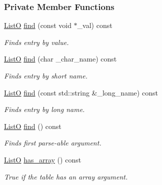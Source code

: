 \subsubsection*{Private Member Functions}
\begin{DoxyCompactItemize}
\item 
\hyperlink{classpoptmx_1_1OptionTable_abaa488ce786d8d553d851d225a82d804}{ListO} \hyperlink{classpoptmx_1_1OptionTable_a99e8f90a0239a5799f585c0830684b36}{find} (const void $\ast$\_\-val) const 
\begin{DoxyCompactList}\small\item\em Finds entry by value. \item\end{DoxyCompactList}\item 
\hyperlink{classpoptmx_1_1OptionTable_abaa488ce786d8d553d851d225a82d804}{ListO} \hyperlink{classpoptmx_1_1OptionTable_acb5976efec27ae5d63f7bbc3e767f758}{find} (char \_\-char\_\-name) const 
\begin{DoxyCompactList}\small\item\em Finds entry by short name. \item\end{DoxyCompactList}\item 
\hyperlink{classpoptmx_1_1OptionTable_abaa488ce786d8d553d851d225a82d804}{ListO} \hyperlink{classpoptmx_1_1OptionTable_a8ff4c5acc11225856c2b114096282f26}{find} (const std::string \&\_\-long\_\-name) const 
\begin{DoxyCompactList}\small\item\em Finds entry by long name. \item\end{DoxyCompactList}\item 
\hyperlink{classpoptmx_1_1OptionTable_abaa488ce786d8d553d851d225a82d804}{ListO} \hyperlink{classpoptmx_1_1OptionTable_af1e5020645bf627e5937e110143760d5}{find} () const 
\begin{DoxyCompactList}\small\item\em Finds first parse-\/able argument. \item\end{DoxyCompactList}\item 
\hyperlink{classpoptmx_1_1OptionTable_abaa488ce786d8d553d851d225a82d804}{ListO} \hyperlink{classpoptmx_1_1OptionTable_a560ff1c0aff2648e060886095dd119fc}{has\_\-array} () const 
\begin{DoxyCompactList}\small\item\em True if the table has an array argument. \item\end{DoxyCompactList}\item 

\end{DoxyCompactItemize}
